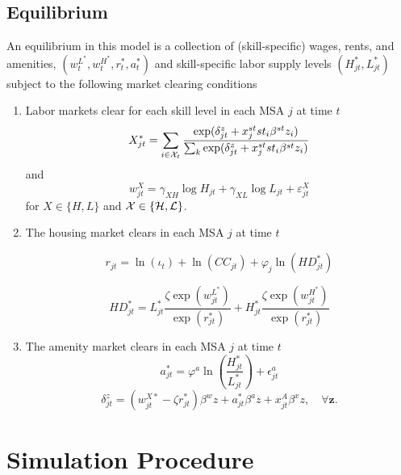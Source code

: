 \documentclass{article}
\begin{document}
\subsection{Equilibrium}
An equilibrium in this model is a collection of (skill-specific) wages, rents, and amenities, $(w_t^{L^*},w_t^{H^*},r_t^*,a_t^*)$ and skill-specific labor supply levels $(H_{jt}^*,L_{jt}^*)$ subject to the following market clearing conditions 
\begin{enumerate}
\item Labor markets clear for each skill level in each MSA $j$ at time $t$ 
$$ X_{jt}^*  = \sum_{i\in\mathcal{X}_t} \frac{\exp(\delta_{jt}^z + x_j^{st}st_i\beta^{st}z_i)}{\sum_{k} \exp(\delta_{jt}^z + x_j^{st}st_i\beta^{st}z_i)}$$
and 
$$w_{jt}^X = \gamma_{X H}\log H_{jt} + \gamma_{X L} \log L_{jt} + \varepsilon_{jt}^X$$
for $X \in \{H, L\}$ and $\mathcal{X} \in \{\mathcal{H}, \mathcal{L}\}$. 
\item The housing market clears in each MSA $j$ at time $t$

$$ r_{jt} = \ln(\iota_t) + \ln(CC_{jt}) + \varphi_j\ln (HD^*_{jt})$$

$$ HD_{jt}^* = L_{jt}^* \frac{\zeta \exp(w_{jt}^{L^*})}{\exp(r_{jt}^*)} + H_{jt}^* \frac{\zeta \exp(w_{jt}^{H^*})}{\exp(r_{jt}^*)}$$

\item The amenity market clears in each MSA $j$ at time $t$
$$a_{jt}^* = \varphi^a \ln\left(\frac{H_{jt}^*}{L_{jt}^*}\right) + \epsilon_{jt}^a$$
$$\delta_{jt}^z = (w^{X*}_{jt} - \zeta r_{jt}^*)\beta^w z + a_{jt}^* \beta^a z + x_{jt}^A\beta^xz, \quad \forall \bm{z}.$$
\end{enumerate}

\section{Simulation Procedure}
\end{document}
